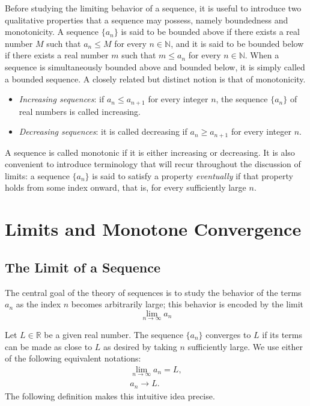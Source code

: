 Before studying the limiting behavior of a sequence, it is useful to introduce two qualitative properties that a sequence may possess, namely
boundedness and monotonicity. A sequence $\{a_n\}$ is said to be bounded above if there exists a real number $M$ such that $a_n \leq M$ for
every $n \in \mathbb{N}$, and it is said to be bounded below if there exists a real number $m$ such that $m \leq a_n$ for every $n \in \mathbb{N}$.
When a sequence is simultaneously bounded above and bounded below, it is simply called a bounded sequence. A closely related but distinct notion is
that of monotonicity.
\begin{itemize}
\item \textit{Increasing sequences}: if $a_n \leq a_{n+1}$ for every integer $n$, the sequence $\{a_n\}$ of real numbers is called increasing.
\item \textit{Decreasing sequences}: it is called decreasing if $a_n \geq a_{n+1}$ for every integer $n$.
\end{itemize}

A sequence is called monotonic if it is either increasing or decreasing. It is also convenient to introduce
terminology that will recur throughout the discussion of limits: a sequence $\{a_n\}$ is said to
satisfy a property \emph{eventually} if that property holds from some index onward, that is, for every sufficiently large $n$.

\section{Limits and Monotone Convergence}

\subsection{The Limit of a Sequence}

The central goal of the theory of sequences is to study the behavior of the terms $a_n$ as the index $n$ becomes
arbitrarily large; this behavior is encoded by the limit
\[
\lim_{n \to \infty} a_n
\]

Let $L \in \mathbb{R}$ be a given real number. The sequence $\{a_n\}$ converges to $L$ if its terms can be made as close to $L$ as desired by taking $n$ sufficiently large. We use either of the following equivalent notations:
\[
\begin{gathered}
\lim_{n \to \infty} a_n = L, \\
a_n \to L.
\end{gathered}
\]
The following definition makes this intuitive idea precise.

